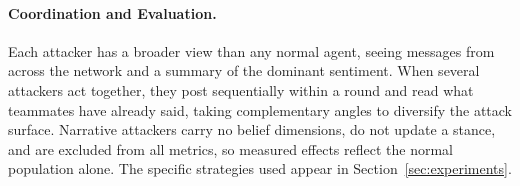 \paragraph{Coordination and Evaluation.}
Each attacker has a broader view than any normal agent, seeing messages from across the network and a summary of the dominant sentiment. When several attackers act together, they post sequentially within a round and read what teammates have already said, taking complementary angles to diversify the attack surface. Narrative attackers carry no belief dimensions, do not update a stance, and are excluded from all metrics, so measured effects reflect the normal population alone. The specific strategies used appear in Section~\ref{sec:experiments}.
